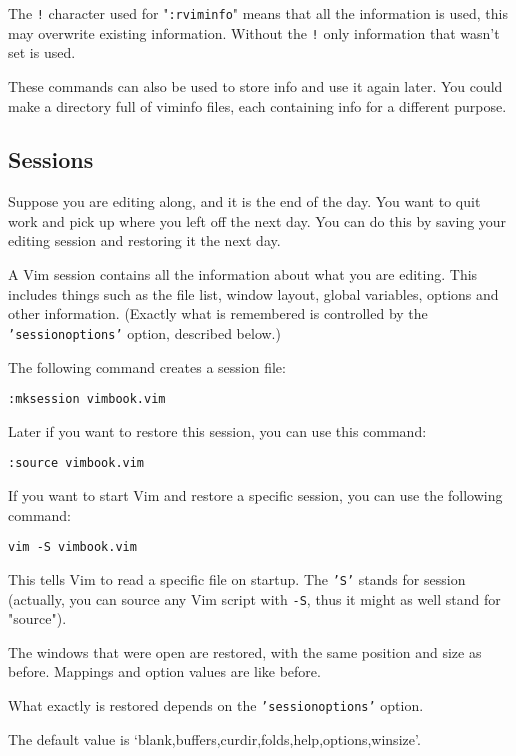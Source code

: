{The \texttt{!} character used for "\texttt{:rviminfo}" means that all the information is used, this may overwrite existing information.
Without the \texttt{!} only information that wasn't set is used.

These commands can also be used to store info and use it again later.
You could make a directory full of viminfo files, each containing info for a different purpose.
\subsection{Sessions}
Suppose you are editing along, and it is the end of the day.
You want to quit work and pick up where you left off the next day.
You can do this by saving your editing session and restoring it the next day.

A Vim session contains all the information about what you are editing.
This includes things such as the file list, window layout, global variables, options and other information.
(Exactly what is remembered is controlled by the \texttt{'sessionoptions'} option, described below.)

The following command creates a session file:

\begin{Verbatim}[samepage=true]
 :mksession vimbook.vim
\end{Verbatim}

Later if you want to restore this session, you can use this command:

\begin{Verbatim}[samepage=true]
 :source vimbook.vim
\end{Verbatim}

If you want to start Vim and restore a specific session, you can use the following command:

\begin{Verbatim}[samepage=true]
 vim -S vimbook.vim
\end{Verbatim}

This tells Vim to read a specific file on startup.
The \texttt{'S'} stands for session (actually, you can source any Vim script with \texttt{-S}, thus it might as well stand for "source").

The windows that were open are restored, with the same position and size as before.
Mappings and option values are like before.

What exactly is restored depends on the \texttt{'sessionoptions'} option.

The default value is `blank,buffers,curdir,folds,help,options,winsize'.

}
